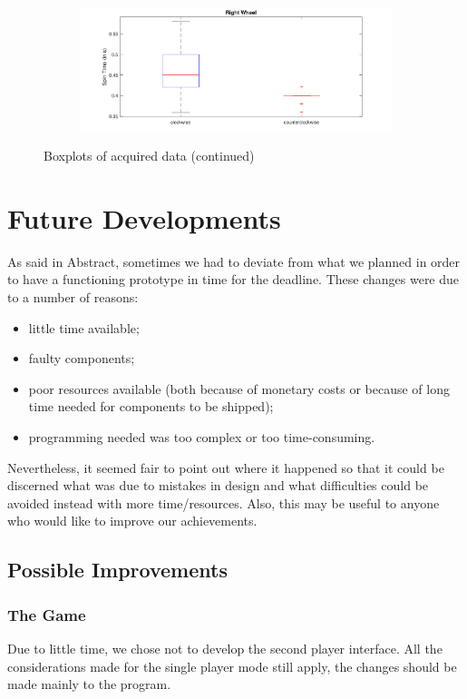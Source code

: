 \documentclass[a4paper,twoside]{book}
\begin{document}
\begin{figure}[h]
\begin{subfigure}[t]{0.4\textwidth}
  \includegraphics[width=\textwidth, center]{img/right2}
  \end{subfigure}
  
  \caption{Boxplots of acquired data (continued)}
\end{figure}


\chapter{Future Developments}

\beforelist* As said in Abstract, sometimes we had to deviate from what we planned in order to have a functioning prototype in time for the deadline. These changes were due to a number of reasons:
\begin{itemize}
\item little time available;
\item faulty components;
\item poor resources available (both because of monetary costs or because of long time needed for components to be shipped);
\item programming needed was too complex or too time-consuming.
\end{itemize}
\afterlist
Nevertheless, it seemed fair to point out where it happened so that it could be discerned what was due to mistakes in design and what difficulties could be avoided instead with more time/resources. Also, this may be useful to anyone who would like to improve our achievements.

\section{Possible Improvements}

\subsection*{The Game}

Due to little time, we chose not to develop the second player interface. All the considerations made for the single player mode still apply, the changes should be made mainly to the program.
\end{document}

